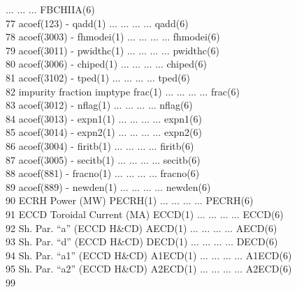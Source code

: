 \begin{tabbing}
$\ldots$ \> $\ldots$ \> $\ldots$ \> \tiny FBCHIIA(6)\\
\tiny 77 \> \tiny acoef(123) \> - \> \tiny qadd(1) \> $\ldots$ \> $\ldots$ \> $\ldots$ \>
$\ldots$ \> \tiny qadd(6)\\
\tiny 78 \> \tiny acoef(3003) \> - \> \tiny fhmodei(1) \> $\ldots$ \> $\ldots$ \> $\ldots$ \>
$\ldots$ \> \tiny fhmodei(6)\\
\tiny 79 \> \tiny acoef(3011) \> - \> \tiny pwidthc(1) \> $\ldots$ \> $\ldots$ \> $\ldots$ \>
$\ldots$ \> \tiny pwidthc(6)\\
\tiny 80 \> \tiny acoef(3006) \> - \> \tiny chiped(1) \> $\ldots$ \> $\ldots$ \> $\ldots$ \>
$\ldots$ \> \tiny chiped(6)\\
\tiny 81 \> \tiny acoef(3102) \> - \> \tiny tped(1) \> $\ldots$ \> $\ldots$ \> $\ldots$ \>
$\ldots$ \> \tiny tped(6)\\
\tiny 82 \> \tiny impurity fraction \> \tiny imptype \> \tiny frac(1) \> $\ldots$ \> $\ldots$ \> $\ldots$ \>
$\ldots$ \> \tiny frac(6)\\ 
\tiny 83 \> \tiny acoef(3012) \> - \> \tiny nflag(1) \> $\ldots$ \> $\ldots$ \> $\ldots$ \>
$\ldots$ \> \tiny nflag(6)\\
\tiny 84 \> \tiny acoef(3013) \> - \> \tiny expn1(1) \> $\ldots$ \> $\ldots$ \> $\ldots$ \>
$\ldots$ \> \tiny expn1(6)\\
\tiny 85 \> \tiny acoef(3014) \> - \> \tiny expn2(1) \> $\ldots$ \> $\ldots$ \> $\ldots$ \>
$\ldots$ \> \tiny expn2(6)\\
\tiny 86 \> \tiny acoef(3004) \> - \> \tiny firitb(1) \> $\ldots$ \> $\ldots$ \> $\ldots$ \>
$\ldots$ \> \tiny firitb(6)\\
\tiny 87 \> \tiny acoef(3005) \> - \> \tiny secitb(1) \> $\ldots$ \> $\ldots$ \> $\ldots$ \>
$\ldots$ \> \tiny secitb(6)\\
\tiny 88 \> \tiny acoef(881) \> - \> \tiny fracno(1) \> $\ldots$ \> $\ldots$ \> $\ldots$ \>
$\ldots$ \> \tiny fracno(6)\\
\tiny 89 \> \tiny acoef(889) \> - \> \tiny newden(1) \> $\ldots$ \> $\ldots$ \> $\ldots$ \>
$\ldots$ \> \tiny newden(6)\\
\tiny 90 \> \tiny ECRH Power (MW) \>  \>\tiny PECRH(1) \> $\ldots$ \> $\ldots$ \> $\ldots$
\> $\ldots$ \> \tiny PECRH(6)\\
\tiny 91 \> \tiny ECCD Toroidal Current (MA) \>  \>\tiny ECCD(1) \> $\ldots$ \> $\ldots$ \> $\ldots$
\> $\ldots$ \> \tiny ECCD(6)\\
\tiny 92 \> \tiny Sh. Par. “a” (ECCD H\&CD) \>  \>\tiny AECD(1) \> $\ldots$ \> $\ldots$ \> $\ldots$
\> $\ldots$ \> \tiny AECD(6)\\
\tiny 93 \> \tiny Sh. Par. “d” (ECCD H\&CD) \>  \>\tiny DECD(1) \> $\ldots$ \> $\ldots$ \> $\ldots$
\> $\ldots$ \> \tiny DECD(6)\\
\tiny 94 \> \tiny Sh. Par. “a1” (ECCD H\&CD) \>  \>\tiny A1ECD(1) \> $\ldots$ \> $\ldots$ \> $\ldots$
\> $\ldots$ \> \tiny A1ECD(6)\\
\tiny 95 \> \tiny Sh. Par. “a2” (ECCD H\&CD) \>  \>\tiny A2ECD(1) \> $\ldots$ \> $\ldots$ \> $\ldots$
\> $\ldots$ \> \tiny A2ECD(6)\\
\tiny 99 \> 
\end{tabbing}
\renewcommand{\baselinestretch}{1.0} \large \normalsize
\newpage
